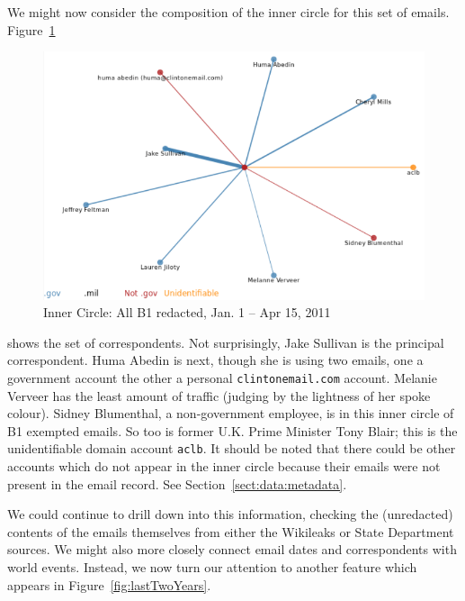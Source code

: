 \documentclass[journal]{vgtc}                %
\begin{document}
We might now consider the composition of the inner circle for this set of emails.  Figure~\ref{fig:InnerCircle2011B1LibyaBuildup} 
\begin{figure}[h]
\begin{center}
\includegraphics[width=0.95\linewidth]{InnerCircle2011B1LibyaBuildup}
\caption{Inner Circle: All  B1 redacted, Jan. 1 -- Apr 15, 2011}
\label{fig:InnerCircle2011B1LibyaBuildup}
\end{center}
\end{figure}
shows the set of correspondents.  Not surprisingly, Jake Sullivan is the principal correspondent.  Huma Abedin is next, though she is using two emails, one a government account the other a personal \texttt{clintonemail.com} account.  Melanie Verveer has the least amount of traffic (judging by the lightness of her spoke colour).  Sidney Blumenthal, a non-government employee, is in this inner circle of B1 exempted emails.  So too is former U.K. Prime Minister Tony Blair; this is the unidentifiable domain account \texttt{aclb}.
It should be noted that there could be other accounts which do not appear in the inner circle because their emails were not present in the email record.  See Section~\ref{sect:data:metadata}.

We could continue to drill down into this information, checking the (unredacted) contents of the emails themselves from either the Wikileaks or State Department sources.  We might also more closely connect email dates and correspondents with world events.   Instead, we now turn our attention to another feature which appears in Figure~\ref{fig:lastTwoYears}.
\end{document}
